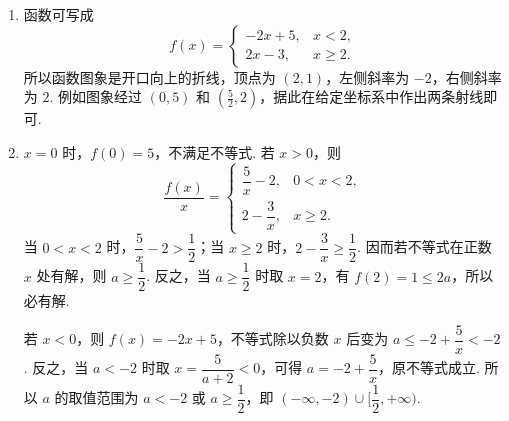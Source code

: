 \begin{solution}
\begin{enumerate}
\item 函数可写成
\[
f(x)=\begin{cases}
-2x+5,&x<2,\\
2x-3,&x\geqslant2.
\end{cases}
\]
所以函数图象是开口向上的折线，顶点为 \((2,1)\)，左侧斜率为 \(-2\)，右侧斜率为 \(2\). 例如图象经过 \((0,5)\) 和 \((\frac52,2)\)，据此在给定坐标系中作出两条射线即可.

\item \(x=0\) 时，\(f(0)=5\)，不满足不等式. 若 \(x>0\)，则
\[
\frac{f(x)}{x}=
\begin{cases}
\dfrac{5}{x}-2,&0<x<2,\\
2-\dfrac{3}{x},&x\geqslant2.
\end{cases}
\]
当 \(0<x<2\) 时，\(\dfrac{5}{x}-2>\dfrac12\)；当 \(x\geqslant2\) 时，\(2-\dfrac{3}{x}\geqslant\dfrac12\). 因而若不等式在正数 \(x\) 处有解，则 \(a\geqslant\dfrac12\). 反之，当 \(a\geqslant\dfrac12\) 时取 \(x=2\)，有 \(f(2)=1\leqslant2a\)，所以必有解.

若 \(x<0\)，则 \(f(x)=-2x+5\)，不等式除以负数 \(x\) 后变为 \(a\leqslant-2+\dfrac{5}{x}<-2\). 反之，当 \(a<-2\) 时取 \(x=\dfrac{5}{a+2}<0\)，可得 \(a=-2+\dfrac{5}{x}\)，原不等式成立. 所以 \(a\) 的取值范围为
\(a<-2\) 或 \(a\geqslant\dfrac12\)，即 \((-\infty,-2)\cup[\dfrac12,+\infty)\).
\end{enumerate}
\end{solution}
